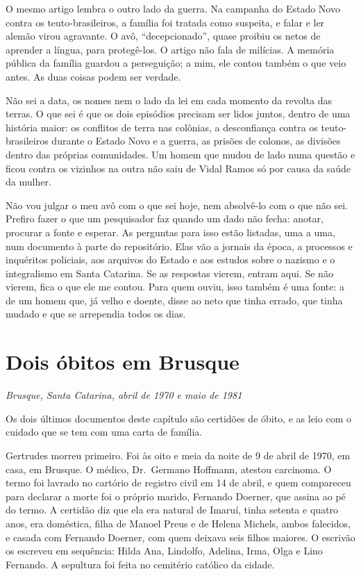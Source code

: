 \documentclass[
  brazilian,
  11pt,
  openany]{book}
\begin{document}
O mesmo artigo lembra o outro lado da guerra. Na campanha do Estado Novo
contra os teuto-brasileiros, a família foi tratada como suspeita, e
falar e ler alemão virou agravante. O avô, ``decepcionado'', quase
proibiu os netos de aprender a língua, para protegê-los. O artigo não
fala de milícias. A memória pública da família guardou a perseguição; a
mim, ele contou também o que veio antes. As duas coisas podem ser
verdade.

Não sei a data, os nomes nem o lado da lei em cada momento da revolta
das terras. O que sei é que os dois episódios precisam ser lidos juntos,
dentro de uma história maior: os conflitos de terra nas colônias, a
desconfiança contra os teuto-brasileiros durante o Estado Novo e a
guerra, as prisões de colonos, as divisões dentro das próprias
comunidades. Um homem que mudou de lado numa questão e ficou contra os
vizinhos na outra não saiu de Vidal Ramos só por causa da saúde da
mulher.

Não vou julgar o meu avô com o que sei hoje, nem absolvê-lo com o que
não sei. Prefiro fazer o que um pesquisador faz quando um dado não
fecha: anotar, procurar a fonte e esperar. As perguntas para isso estão
listadas, uma a uma, num documento à parte do repositório. Elas vão a
jornais da época, a processos e inquéritos policiais, aos arquivos do
Estado e aos estudos sobre o nazismo e o integralismo em Santa Catarina.
Se as respostas vierem, entram aqui. Se não vierem, fica o que ele me
contou. Para quem ouviu, isso também é uma fonte: a de um homem que, já
velho e doente, disse ao neto que tinha errado, que tinha mudado e que
se arrependia todos os dias.

\section{Dois óbitos em Brusque}\label{dois-uxf3bitos-em-brusque}

\emph{Brusque, Santa Catarina, abril de 1970 e maio de 1981}

Os dois últimos documentos deste capítulo são certidões de óbito, e as
leio com o cuidado que se tem com uma carta de família.

Gertrudes morreu primeiro. Foi às oito e meia da noite de 9 de abril de
1970, em casa, em Brusque. O médico, Dr.~Germano Hoffmann, atestou
carcinoma. O termo foi lavrado no cartório de registro civil em 14 de
abril, e quem compareceu para declarar a morte foi o próprio marido,
Fernando Doerner, que assina ao pé do termo. A certidão diz que ela era
natural de Imaruí, tinha setenta e quatro anos, era doméstica, filha de
Manoel Preus e de Helena Michels, ambos falecidos, e casada com Fernando
Doerner, com quem deixava seis filhos maiores. O escrivão os escreveu em
sequência: Hilda Ana, Lindolfo, Adelina, Irma, Olga e Lino Fernando. A
sepultura foi feita no cemitério católico da cidade.
\end{document}
